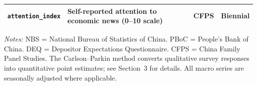 \begin{landscape}
\begin{table}[htbp]
\begin{threeparttable}
\begin{tabular}{@{}l p{7cm} l l@{}}
\texttt{attention\_index} & Self-reported attention to economic news (0--10 scale) & CFPS & Biennial \\
\bottomrule
\end{tabular}
\begin{tablenotes}[flushleft]
\footnotesize
\item \textit{Notes:} NBS = National Bureau of Statistics of China. PBoC = People's Bank of China. DEQ = Depositor Expectations Questionnaire. CFPS = China Family Panel Studies. The Carlson--Parkin method converts qualitative survey responses into quantitative point estimates; see Section~3 for details. All macro series are seasonally adjusted where applicable.
\end{tablenotes}
\end{threeparttable}
\end{table}
\end{landscape}
